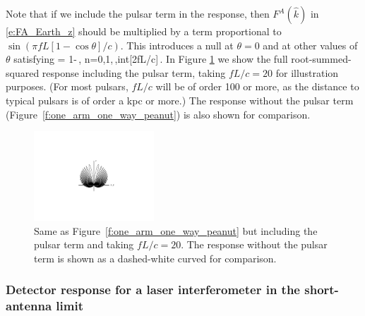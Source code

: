 Note that if we include the pulsar term in the response,
then $F^A(\hat k)$ in \eqref{e:FA_Earth_z} 
should be multiplied 
by a term proportional to $\sin(\pi f L[1-\cos\theta]/c)$.
This introduces a null at $\theta=0$ and at other values 
of $\theta$ satisfying
%
\be
\cos\theta = 1-\,,
\qquad n=0,1,\cdots\,,{\rm int}[2fL/c]\,.
\ee
%
In Figure \ref{f:one_arm_one_way_peanut_full} we show
the full root-summed-squared response 
including the pulsar term,
taking $fL/c=20$ for illustration purposes.
(For most pulsars, $fL/c$ will be of order 100 
or more, as the distance to typical pulsars is 
of order a kpc or more.)
The response without the pulsar term 
(Figure~\ref{f:one_arm_one_way_peanut}) is also
shown for comparison.
%
\begin{figure}[htbp!]
\begin{center}
\includegraphics[width=0.4\textwidth]{Figures/pulsarPeanutComparison}
\caption{Same as Figure~\ref{f:one_arm_one_way_peanut} but 
including the pulsar term and taking $fL/c=20$.
The response without the pulsar term is shown as a 
dashed-white curved for comparison.}
\label{f:one_arm_one_way_peanut_full}
\end{center}
\end{figure}
%

\subsubsection{Detector response for a laser interferometer 
in the short-antenna limit}


